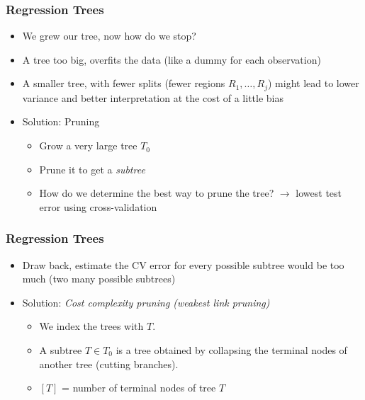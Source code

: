 \documentclass[
  shownotes,
  xcolor={svgnames},
  hyperref={colorlinks,citecolor=DarkBlue,linkcolor=DarkRed,urlcolor=DarkBlue}
  ]{beamer}
\begin{document}
\begin{frame}[fragile]
\frametitle{Regression Trees}
\begin{itemize}
\item We grew our tree, now how do we stop?
\medskip
\item A tree too big, overfits the data (like a dummy for each observation)
\medskip
\item A smaller tree, with fewer splits (fewer regions $R_1,\dots,R_j$) might lead to lower variance and better interpretation at the cost of a little bias
\medskip
\item Solution: Pruning
\begin{itemize}
 \item Grow a very large tree $T_0$
 \item Prune it to get a {\it subtree}
 \item How do we determine the best way to prune the tree? $\rightarrow$ lowest test error using cross-validation
\end{itemize}

\end{itemize}

\end{frame}
\begin{frame}[fragile]
\frametitle{Regression Trees}

\begin{itemize}
\item Draw back, estimate the CV error for every possible subtree would be too much (two many possible subtrees)
\medskip
\item Solution: {\it Cost complexity pruning (weakest link pruning)}
\medskip
\begin{itemize}
    \item We index the trees with $T$.
    \medskip
    \item A subtree $T \in T_0$ is a tree obtained by collapsing the terminal nodes of another tree (cutting branches).
    \medskip
    \item  $[T]$ = number of terminal nodes of tree $T$
\end{itemize}
\end{itemize}
\end{frame}
\end{document}
